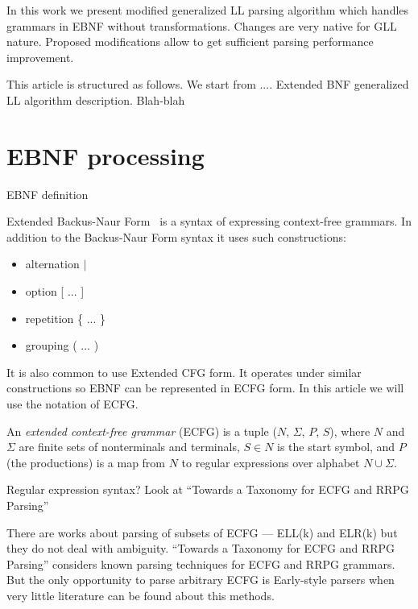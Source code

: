 \documentclass[runningheads,a4paper]{llncs}
\begin{document}
In this work we present modified generalized LL parsing algorithm which handles grammars in EBNF without transformations.
Changes are very native for GLL nature.
Proposed modifications allow to get sufficient parsing performance improvement.

This article is structured as follows.
We start from .... Extended BNF
generalized LL algorithm description.
Blah-blah





\section{EBNF processing}

EBNF definition%

Extended Backus-Naur Form~\cite{iso} is a syntax of expressing context-free grammars. In addition to the Backus-Naur Form syntax it 
uses such constructions:
\begin{itemize}
    \item alternation $\mid$
    \item option [ ... ]
    \item repetition \{ ... \}
    \item grouping ( ... )
\end{itemize}
It is also common to use Extended CFG form. It operates under similar constructions so EBNF can be represented in ECFG form.
In this article we will use the notation of ECFG.

An \textit{extended context-free grammar} (ECFG) is a tuple ($N$, $\Sigma$, $P$, $S$), where $N$
and $\Sigma$ are finite sets of nonterminals and terminals, $ S\in N$ is the start symbol,
and $P$ (the productions) is a map from $N$ to regular expressions over alphabet $N \cup \Sigma$.

Regular expression syntax? Look at ``Towards a Taxonomy for ECFG and RRPG Parsing''

There are works about parsing of subsets of ECFG --- ELL(k) and ELR(k) but they do not deal with ambiguity.
``Towards a Taxonomy for ECFG and RRPG Parsing'' considers known parsing techniques for ECFG and RRPG grammars. 
But the only opportunity to parse arbitrary ECFG is Early-style parsers when very little literature can be found about this methods.
\end{document}
